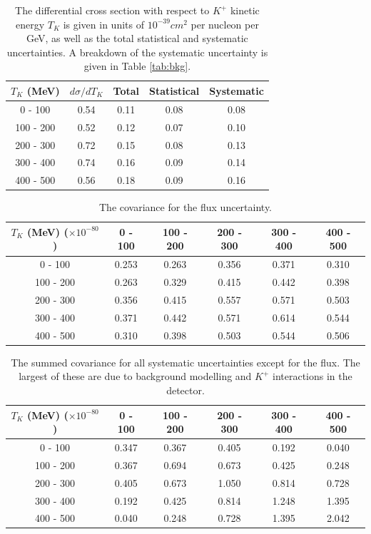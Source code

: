 \documentclass[aps,prl,preprint,showpacs,superscriptaddress,nofootinbib,floatfix,linenumbers]{revtex4}
\newcommand{\kp}{\ensuremath{K^{+}}\xspace}
\begin{document}
\begingroup
\squeezetable
\begin{table}[h]
\begin{tabular}{ccccc}
\hline\hline
$T_{K}$ (MeV) & $d\sigma/dT_{K}$ & Total & Statistical & Systematic \\
\hline
0 - 100 & 0.54 & 0.11 & 0.08 & 0.08 \\ 
100 - 200 & 0.52 & 0.12 & 0.07 & 0.10 \\ 
200 - 300 & 0.72 & 0.15 & 0.08 & 0.13 \\ 
300 - 400 & 0.74 & 0.16 & 0.09 & 0.14 \\ 
400 - 500 & 0.56 & 0.18 & 0.09 & 0.16 \\ 

\hline\hline
\end{tabular}
\caption{The differential cross section with respect to \kp kinetic energy $T_{K}$ is given in units of $10^{-39} cm^{2}$ per nucleon per GeV, as well as the total statistical and systematic uncertainties. A breakdown of the systematic uncertainty is given in Table \ref{tab:bkg}.}
\label{tab:xs}
\end{table}
\endgroup

\begingroup
\squeezetable
\begin{table}[h]
\begin{tabular}{cccccc}
\hline\hline
$T_{K}$ (MeV) ($\times 10^{-80}$) &   0 - 100 & 100 - 200 & 200 - 300 & 300 - 400 & 400 - 500 \\
\hline
  0 - 100 & 0.253 & 0.263 & 0.356 & 0.371 & 0.310 \\
100 - 200 & 0.263 & 0.329 & 0.415 & 0.442 & 0.398 \\
200 - 300 & 0.356 & 0.415 & 0.557 & 0.571 & 0.503 \\
300 - 400 & 0.371 & 0.442 & 0.571 & 0.614 & 0.544 \\
400 - 500 & 0.310 & 0.398 & 0.503 & 0.544 & 0.506 \\
\hline\hline
\end{tabular}
\caption{The covariance for the flux uncertainty.}
\label{tab:nonfluxcov}
\end{table}
\endgroup

\begingroup
\squeezetable
\begin{table}[h]
\begin{tabular}{cccccc}
\hline\hline
$T_{K}$ (MeV) ($\times 10^{-80}$) &   0 - 100 & 100 - 200 & 200 - 300 & 300 - 400 & 400 - 500 \\
\hline
  0 - 100 & 0.347 & 0.367 & 0.405 & 0.192 & 0.040 \\
100 - 200 & 0.367 & 0.694 & 0.673 & 0.425 & 0.248 \\
200 - 300 & 0.405 & 0.673 & 1.050 & 0.814 & 0.728 \\
300 - 400 & 0.192 & 0.425 & 0.814 & 1.248 & 1.395 \\
400 - 500 & 0.040 & 0.248 & 0.728 & 1.395 & 2.042 \\
\hline\hline
\end{tabular}
\caption{The summed covariance for all systematic uncertainties except for the flux. The largest of these are due to background modelling and \kp interactions in the detector.}
\label{tab:statcov}
\end{table}
\endgroup
\end{document}
